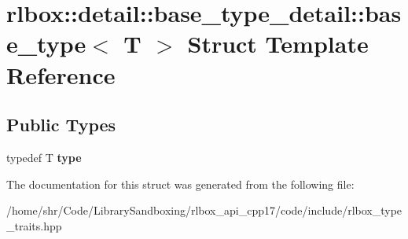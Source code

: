 \hypertarget{structrlbox_1_1detail_1_1base__type__detail_1_1base__type}{}\section{rlbox\+:\+:detail\+:\+:base\+\_\+type\+\_\+detail\+:\+:base\+\_\+type$<$ T $>$ Struct Template Reference}
\label{structrlbox_1_1detail_1_1base__type__detail_1_1base__type}
\subsection*{Public Types}
\begin{DoxyCompactItemize}
\item 
\mbox{\label{structrlbox_1_1detail_1_1base__type__detail_1_1base__type_af9466e26bc26b30bd00bf9361b163813}} 
typedef T {\bfseries type}
\end{DoxyCompactItemize}


The documentation for this struct was generated from the following file\+:\begin{DoxyCompactItemize}
\item 
/home/shr/\+Code/\+Library\+Sandboxing/rlbox\+\_\+api\+\_\+cpp17/code/include/rlbox\+\_\+type\+\_\+traits.\+hpp\end{DoxyCompactItemize}
